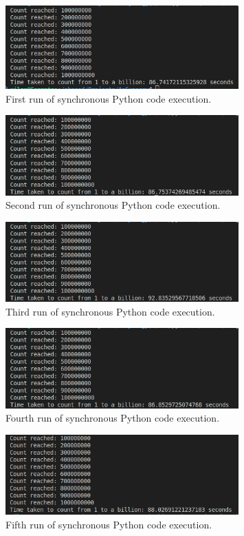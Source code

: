 \documentclass{article}
\begin{document}
\begin{figure}[htbp]
    \centering
    \includegraphics[width=0.8\textwidth]{../records/results_python/result_1.png}
    \caption{First run of synchronous Python code execution.}
    \label{fig:Python-runtime-1}
\end{figure}

\begin{figure}[htbp]
    \centering
    \includegraphics[width=0.8\textwidth]{../records/results_python/result_2.png}
    \caption{Second run of synchronous Python code execution.}
    \label{fig:Python-runtime-2}
\end{figure}

\begin{figure}[htbp]
    \centering
    \includegraphics[width=0.8\textwidth]{../records/results_python/result_3.png}
    \caption{Third run of synchronous Python code execution.}
    \label{fig:Python-runtime-3}
\end{figure}

\begin{figure}[htbp]
    \centering
    \includegraphics[width=0.8\textwidth]{../records/results_python/result_4.png}
    \caption{Fourth run of synchronous Python code execution.}
    \label{fig:Python-runtime-4}
\end{figure}

\begin{figure}[htbp]
    \centering
    \includegraphics[width=0.8\textwidth]{../records/results_python/result_5.png}
    \caption{Fifth run of synchronous Python code execution.}
    \label{fig:Python-runtime-5}
\end{figure}
\end{document}
